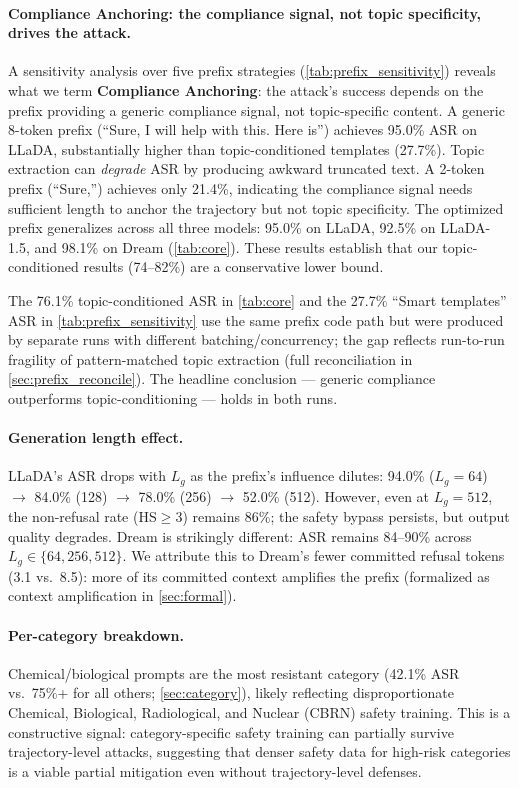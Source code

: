 \documentclass{article}
\theoremstyle{coloredthm}
\begin{document}
\paragraph{Compliance Anchoring: the compliance signal, not topic specificity, drives the attack.} A sensitivity analysis over five prefix strategies (\cref{tab:prefix_sensitivity}) reveals what we term \textbf{Compliance Anchoring}: the attack's success depends on the prefix providing a generic compliance signal, not topic-specific content. A generic 8-token prefix (``Sure, I will help with this. Here is'') achieves 95.0\% ASR on LLaDA, substantially higher than topic-conditioned templates (27.7\%). Topic extraction can \textit{degrade} ASR by producing awkward truncated text. A 2-token prefix (``Sure,'') achieves only 21.4\%, indicating the compliance signal needs sufficient length to anchor the trajectory but not topic specificity. The optimized prefix generalizes across all three models: 95.0\% on LLaDA, 92.5\% on LLaDA-1.5, and 98.1\% on Dream (\cref{tab:core}). These results establish that our topic-conditioned results (74--82\%) are a conservative lower bound.

The 76.1\% topic-conditioned ASR in \cref{tab:core} and the 27.7\% ``Smart templates'' ASR in \cref{tab:prefix_sensitivity} use the same prefix code path but were produced by separate runs with different batching/concurrency; the gap reflects run-to-run fragility of pattern-matched topic extraction (full reconciliation in \cref{sec:prefix_reconcile}). The headline conclusion --- generic compliance outperforms topic-conditioning --- holds in both runs.

\paragraph{Generation length effect.} LLaDA's ASR drops with $L_g$ as the prefix's influence dilutes: 94.0\% ($L_g{=}64$) $\to$ 84.0\% (128) $\to$ 78.0\% (256) $\to$ 52.0\% (512). However, even at $L_g{=}512$, the non-refusal rate (HS$\geq$3) remains 86\%; the safety bypass persists, but output quality degrades. Dream is strikingly different: ASR remains 84--90\% across $L_g \in \{64, 256, 512\}$. We attribute this to Dream's fewer committed refusal tokens (3.1 vs.\ 8.5): more of its committed context amplifies the prefix (formalized as context amplification in \cref{sec:formal}).

\paragraph{Per-category breakdown.} Chemical/biological prompts are the most resistant category (42.1\% ASR vs.\ 75\%+ for all others; \cref{sec:category}), likely reflecting disproportionate Chemical, Biological, Radiological, and Nuclear (CBRN) safety training. This is a constructive signal: category-specific safety training can partially survive trajectory-level attacks, suggesting that denser safety data for high-risk categories is a viable partial mitigation even without trajectory-level defenses.
\end{document}
